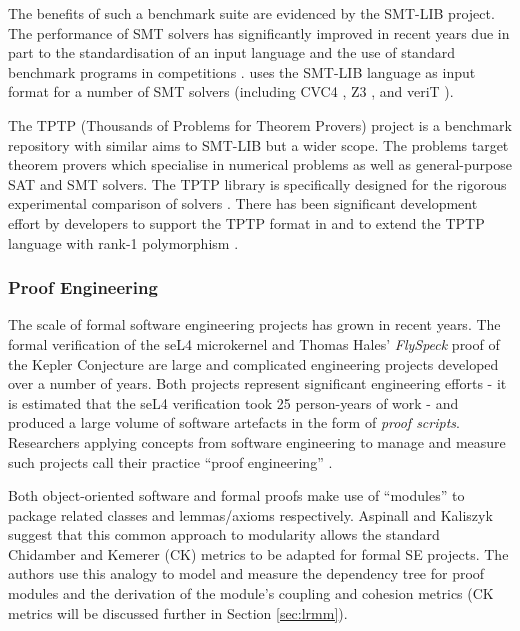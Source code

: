 The benefits of such a benchmark suite are evidenced by the SMT-LIB \cite{SMTLIB} project. The performance of SMT solvers has significantly improved in recent years due in part to the standardisation of an input language and the use of standard benchmark programs in competitions \cite{SMTEVAL2013}. \why uses the SMT-LIB language as input format for a number of SMT solvers (including CVC4 \cite{CVC4}, Z3 \cite{Z3}, and veriT \cite{veriT}). 

The TPTP (Thousands of Problems for Theorem Provers) project \cite{TPTP} is a benchmark repository with similar aims to SMT-LIB but a wider scope. The problems target theorem provers which specialise in numerical problems as well as general-purpose SAT and SMT solvers. The TPTP library is specifically designed for the rigorous experimental comparison of solvers \cite{Sutcliffe200139}. There has been significant development effort by \why developers to support the TPTP format in \why and to extend the TPTP language with rank-1 polymorphism \cite{why:tptp}. 

\subsubsection{Proof Engineering}
\label{sub:lrsvmmpe}

The scale of formal software engineering projects has grown in recent years. The formal verification of the seL4 microkernel \cite{Klein:2014:CFV} and Thomas Hales' \textit{FlySpeck} proof of the Kepler Conjecture \cite{hales-kepler} are large and complicated engineering projects developed over a number of years. Both projects represent significant engineering efforts - it is estimated that the seL4 verification took 25 person-years of work - and produced a large volume of software artefacts in the form of \textit{proof scripts}. Researchers applying concepts from software engineering to manage and measure such projects call their practice ``proof engineering'' \cite{Klein2014}.

Both object-oriented software and formal proofs make use of ``modules'' to package related classes and lemmas/axioms respectively. Aspinall and Kaliszyk \cite{Aspinall2016} suggest that this common approach to modularity allows the standard Chidamber and Kemerer \cite{CandK} (CK) metrics to be adapted for formal SE projects. The authors use this analogy to model and measure the dependency tree for proof modules and the derivation of the module's coupling and cohesion metrics (CK metrics will be discussed further in Section \ref{sec:lrmm}).


